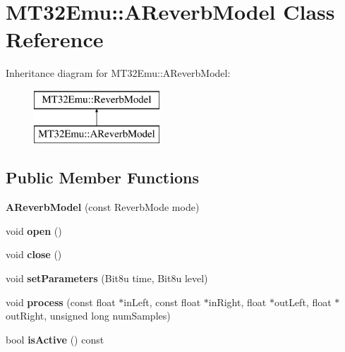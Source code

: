 \hypertarget{classMT32Emu_1_1AReverbModel}{\section{M\-T32\-Emu\-:\-:A\-Reverb\-Model Class Reference}
\label{classMT32Emu_1_1AReverbModel}
}
Inheritance diagram for M\-T32\-Emu\-:\-:A\-Reverb\-Model\-:\begin{figure}[H]
\begin{center}
\leavevmode
\includegraphics[height=2.000000cm]{classMT32Emu_1_1AReverbModel}
\end{center}
\end{figure}
\subsection*{Public Member Functions}
\begin{DoxyCompactItemize}
\item 
\hypertarget{classMT32Emu_1_1AReverbModel_af353d5c272bf6a08c244b9450c8c0fb6}{{\bfseries A\-Reverb\-Model} (const Reverb\-Mode mode)}\label{classMT32Emu_1_1AReverbModel_af353d5c272bf6a08c244b9450c8c0fb6}

\item 
\hypertarget{classMT32Emu_1_1AReverbModel_a415f3e6d6bcdcdd92c181194ed07ff36}{void {\bfseries open} ()}\label{classMT32Emu_1_1AReverbModel_a415f3e6d6bcdcdd92c181194ed07ff36}

\item 
\hypertarget{classMT32Emu_1_1AReverbModel_a4f2ee90b54a28533aee857bf718dcbdf}{void {\bfseries close} ()}\label{classMT32Emu_1_1AReverbModel_a4f2ee90b54a28533aee857bf718dcbdf}

\item 
\hypertarget{classMT32Emu_1_1AReverbModel_a3e9dafba76c81fa753dfd67508cfb826}{void {\bfseries set\-Parameters} (Bit8u time, Bit8u level)}\label{classMT32Emu_1_1AReverbModel_a3e9dafba76c81fa753dfd67508cfb826}

\item 
\hypertarget{classMT32Emu_1_1AReverbModel_ac4600ff6b73541c3a424dd0dd9f5c14b}{void {\bfseries process} (const float $\ast$in\-Left, const float $\ast$in\-Right, float $\ast$out\-Left, float $\ast$out\-Right, unsigned long num\-Samples)}\label{classMT32Emu_1_1AReverbModel_ac4600ff6b73541c3a424dd0dd9f5c14b}

\item 
\hypertarget{classMT32Emu_1_1AReverbModel_a4789d6f78a8e518eaa3338a09d1c4293}{bool {\bfseries is\-Active} () const }\label{classMT32Emu_1_1AReverbModel_a4789d6f78a8e518eaa3338a09d1c4293}

\end{DoxyCompactItemize}


